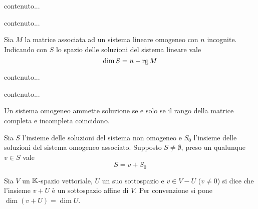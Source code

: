 
\begin{definition}
	contenuto...
\end{definition}

\begin{definition}
	contenuto...
\end{definition}

\begin{prop}
	Sia $ M $ la matrice associata ad un sistema lineare omogeneo con $ n $ incognite. Indicando con $ S $ lo spazio delle soluzioni del sistema lineare vale \[\dim{S} = n - \operatorname{rg}{M}\]
\end{prop}


\begin{definition}
	contenuto...
\end{definition}

\begin{definition}
	contenuto...
\end{definition}

\begin{thm}
	Un sistema omogeneo ammette soluzione se e solo se il rango della matrice completa e incompleta coincidono.
\end{thm}

\begin{thm}
	Sia $ S $ l'insieme delle soluzioni del sistema non omogeneo e $ S_0 $ l'insieme delle soluzioni del sistema omogeneo associato. Supposto $ S \neq \emptyset $, preso un qualunque $ v \in S $ vale \[S = v + S_0\]
\end{thm}

\begin{definition}
	Sia $ V $ un $ \mathbb{K} $-spazio vettoriale, $ U $ un suo sottospazio e $ v \in V - U $ ($ v \neq 0 $) si dice che l'insieme $ v + U $ è un sottospazio affine di $ V $. Per convenzione si pone $ \dim{(v + U)} = \dim{U} $.
\end{definition}